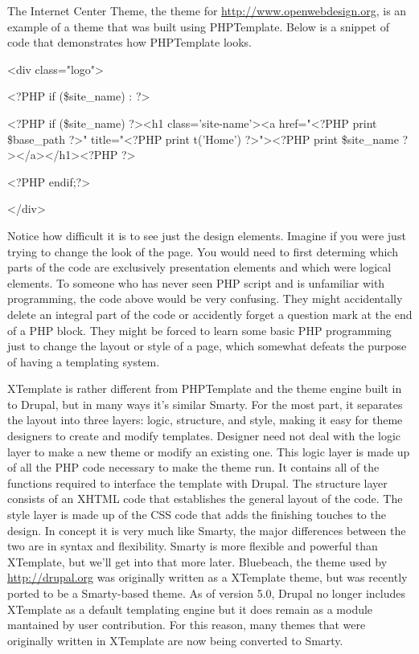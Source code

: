 \documentclass[a4paper,12pt]{report}
\begin{document}
The Internet Center Theme, the theme for \url{http://www.openwebdesign.org}, is an example of a theme that was built using PHPTemplate. Below is a snippet of code that demonstrates how PHPTemplate looks. 

<div class="logo">

        <?PHP if (\$site_name) : ?>

            <?PHP if (\$site_name) { ?><h1 class='site-name'><a href="<?PHP print \$base_path ?>" title="<?PHP print t('Home') ?>"><?PHP print \$site_name ?></a></h1><?PHP } ?>

        <?PHP endif;?>

</div>


Notice how difficult it is to see just the design elements. 
Imagine if you were just trying to change the look of the page. 
You would need to first determing which parts of the code are exclusively presentation elements and which were logical elements. 
To someone who has never seen PHP script and is unfamiliar with programming, the code above would be very confusing. 
They might accidentally delete an integral part of the code or accidently forget a question mark at the end of a PHP block. 
They might be forced to learn some basic PHP programming just to change the layout or style of a page, which somewhat defeats the purpose of having a templating system.


XTemplate is rather different from PHPTemplate and the theme engine built in to Drupal, but in many ways it's similar Smarty. 
For the most part, it separates the layout into three layers: logic, structure, and style, making it easy for theme designers to create and modify templates. 
Designer need not deal with the logic layer to make a new theme or modify an existing one. 
This logic layer is made up of all the PHP code necessary to make the theme run. 
It contains all of the functions required to interface the template with Drupal. 
The structure layer consists of an XHTML code that establishes the general layout of the code. 
The style layer is made up of the CSS code that adds the finishing touches to the design. 
In concept it is very much like Smarty, the major differences between the two are in syntax and flexibility.
Smarty is more flexible and powerful than XTemplate, but we'll get into that more later. 
Bluebeach, the theme used by \url{http://drupal.org} was originally written as a XTemplate theme, but was recently ported to be a Smarty-based theme. 
As of version 5.0, Drupal no longer includes XTemplate as a default templating engine but it does remain as a module mantained by user contribution. 
For this reason, many themes that were originally written in XTemplate are now being converted to Smarty. 
\end{document}
